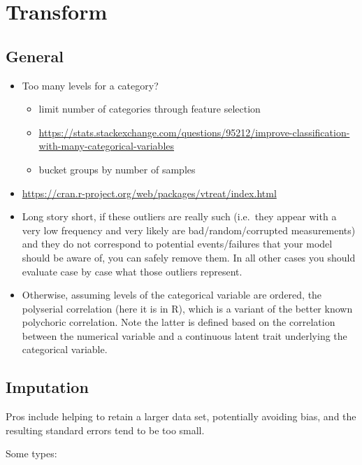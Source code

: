 \documentclass[]{book}
\providecommand{\tightlist}{%
  \setlength{\itemsep}{0pt}\setlength{\parskip}{0pt}}
\theoremstyle{definition}
\theoremstyle{definition}
\theoremstyle{definition}
\theoremstyle{remark}
\begin{document}
\section{Transform}\label{transform}

\subsection{General}\label{general-2}

\begin{itemize}
\item
  Too many levels for a category?

  \begin{itemize}
  \tightlist
  \item
    limit number of categories through feature selection
  \item
    \url{https://stats.stackexchange.com/questions/95212/improve-classification-with-many-categorical-variables}
  \item
    bucket groups by number of samples
  \end{itemize}
\item
  \url{https://cran.r-project.org/web/packages/vtreat/index.html}
\item
  Long story short, if these outliers are really such (i.e.~they appear
  with a very low frequency and very likely are bad/random/corrupted
  measurements) and they do not correspond to potential events/failures
  that your model should be aware of, you can safely remove them. In all
  other cases you should evaluate case by case what those outliers
  represent.
\item
  Otherwise, assuming levels of the categorical variable are ordered,
  the polyserial correlation (here it is in R), which is a variant of
  the better known polychoric correlation. Note the latter is defined
  based on the correlation between the numerical variable and a
  continuous latent trait underlying the categorical variable.
\end{itemize}

\subsection{Imputation}\label{imputation}

Pros include helping to retain a larger data set, potentially avoiding
bias, and the resulting standard errors tend to be too small.

Some types:
\end{document}
